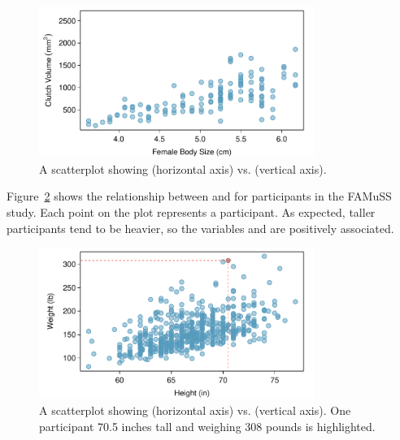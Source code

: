 \begin{doublespace}
\begin{figure}
\centering
\includegraphics[width=0.8\textwidth]
{ch_intro_to_data_oi_biostat/figures/frogClutchVolBodySize/frogClutchVolBodySize}
\caption{A scatterplot showing  (horizontal axis) vs.  (vertical axis). }
\label{frogClutchVolBodySize}
\end{figure}


Figure~\ref{famussHeightWeight} shows the relationship between  and  for participants in the FAMuSS study.  Each point on the plot represents a participant. As expected, taller participants tend to be heavier, so the variables  and  are positively associated.  

\begin{figure}[h]
\centering
\includegraphics[width=0.8\textwidth]
{ch_intro_to_data_oi_biostat/figures/famussHeightWeight/famussHeightWeight}
\caption{A scatterplot showing  (horizontal axis) vs.  (vertical axis). One participant 70.5 inches tall and weighing 308 pounds is highlighted.}
\label{famussHeightWeight}
\end{figure}


\end{doublespace}

